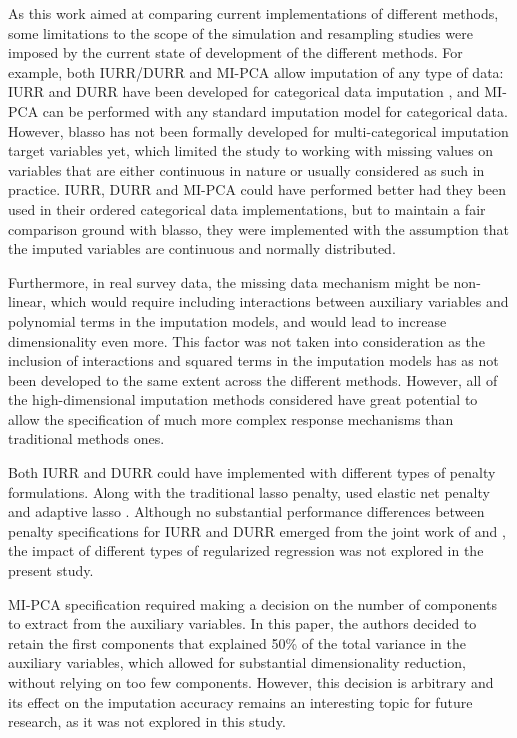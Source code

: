 	As this work aimed at comparing current implementations of different methods, some limitations
	to the scope of the simulation and resampling studies were imposed by the current state of development of 
	the different methods.
	For example, both IURR/DURR and MI-PCA allow imputation of any type of data:
	IURR and DURR have been developed for categorical data imputation \citep{dengEtAl:2016},
	and MI-PCA can be performed with any standard imputation model for categorical data.
	However, blasso has not been formally developed for multi-categorical imputation target variables yet, 
	which limited the study to working with missing values on variables that are either continuous in nature 
	or usually considered as such in practice.
	IURR, DURR and MI-PCA could have performed better had they been used in their ordered categorical data
	implementations, but to maintain a fair comparison ground with blasso, they were implemented with the
	assumption that the imputed variables are continuous and normally distributed.

	Furthermore, in real survey data, the missing data mechanism might be non-linear, which would require
	including interactions between auxiliary variables and polynomial terms in the imputation models,
	and would lead to increase dimensionality even more.
	This factor was not taken into consideration as the inclusion of interactions and squared terms in the 
	imputation models has as not been developed to the same extent across the different methods.
	However, all of the high-dimensional imputation methods considered have great potential to allow the 
	specification of much more complex response mechanisms than traditional methods ones.

	Both IURR and DURR could have implemented with different types of penalty formulations.
	Along with the traditional lasso penalty, \cite{zhaoLong:2016} used elastic net penalty \citep{zouHastie:2005} 
	and adaptive lasso \citep{zou:2006}.
	Although no substantial performance differences between penalty specifications for IURR and DURR emerged 
	from the joint work of \cite{zhaoLong:2016} and \cite{dengEtAl:2016}, the impact of different types of 
	regularized regression was not explored in the present study. 

	MI-PCA specification required making a decision on the number of components to extract from the auxiliary 
	variables.
	In this paper, the authors decided to retain the first components that explained 50\% of the 
	total variance in the auxiliary variables, which allowed for substantial dimensionality reduction, 
	without relying on too few components.
	However, this decision is arbitrary and its effect on the imputation accuracy remains an interesting 
	topic for future research, as it was not explored in this study.


